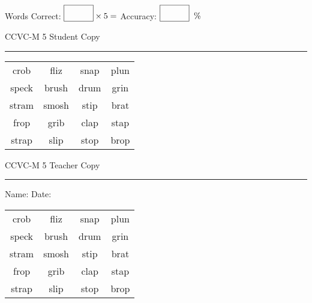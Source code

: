 \documentclass{memoir}
\begin{document}
\small

Words Correct: $\fbox{\phantom{\huge 100}} \times 5 = $ Accuracy: $\fbox{\phantom{\huge 100}}\;\; \%$ 

\vfill

\newpage


\footnotesize \noindent
CCVC-M 5 \hfill Student Copy
\smallskip
\hrule

\Large

\setlength{\tabcolsep}{14pt}
\def\arraystretch{3}

{\selectfont


\begin{vplace}[0.5]
\begin{center}
\begin{tabular}{cccc}
crob & fliz & snap & plun \\
speck & brush & drum & grin     \\
stram & smosh & stip & brat               \\
frop & grib                    & clap             & stap \\
strap & slip & stop & brop   \\
\end{tabular}
\end{center}
\end{vplace}

}

\newpage

\footnotesize \noindent
CCVC-M 5 \hfill Teacher Copy
\smallskip
\hrule

\small

\vfill

\noindent
Name: \underline{\hspace{1.75in}} \hfill Date: \underline{\hspace{1in}}

\Large

{\selectfont


\begin{vplace}[0.5]
\begin{center}
\begin{tabular}{cccc}
crob & fliz & snap & plun \\
speck & brush & drum & grin     \\
stram & smosh & stip & brat               \\
frop & grib                    & clap             & stap \\
strap & slip & stop & brop   \\
\end{tabular}
\end{center}
\end{vplace}



}
\end{document}
